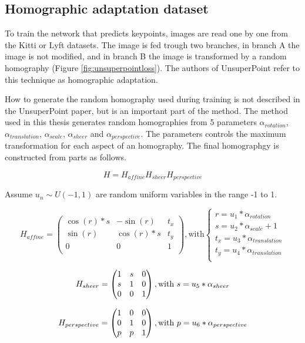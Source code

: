 \subsection{Homographic adaptation dataset}

To train the network that predicts keypoints, images are read one by one from the Kitti or Lyft datasets. The image is fed trough two branches, in branch A the image is not modified, and in branch B the image is transformed by a random homography (Figure \ref{fig:unsuperpointloss}). The authors of UnsuperPoint refer to this technique as homographic adaptation.

How to generate the random homography used during training is not described in the UnsuperPoint paper, but is an important part of the method. The method used in this thesis generates random homographies from 5 parameters $\alpha_{rotation}$, $\alpha_{translation}$, $\alpha_{scale}$, $\alpha_{sheer}$ and $\alpha_{perspective}$. The parameters controls the maximum transformation for each aspect of an homography. The final homographgy is constructed from parts as follows.

\[
H = H_{affine} H_{sheer} H_{perspective}
\]

Assume $u_n \sim U(-1,1)$ are random uniform variables in the range -1 to 1.

\[
H_{affine} = 
\begin{pmatrix}
\cos(r)*s & -\sin(r) & t_x \\
\sin(r)& \cos(r)*s & t_y \\
0 & 0 & 1 \\
\end{pmatrix}
, \text{with}
\begin{cases}
r=u_1*\alpha_{rotation} \\
s=u_2*\alpha_{scale}+1 \\
t_x=u_3*\alpha_{translation} \\
t_y=u_4*\alpha_{translation} \\
\end{cases}
\]

\[
H_{sheer} = 
\begin{pmatrix}
1 & s & 0 \\
s & 1 & 0 \\
0 & 0 & 1 \\
\end{pmatrix}
, \text{with}
\ s=u_5*\alpha_{sheer} \\
\]

\[
H_{perspective} = 
\begin{pmatrix}
1 & 0 & 0 \\
0 & 1 & 0 \\
p & p & 1 \\
\end{pmatrix}
, \text{with}
\ p=u_6*\alpha_{perspective} \\
\]

